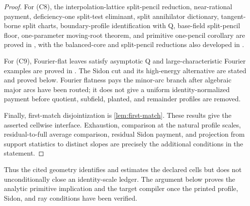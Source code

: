 \documentclass[11pt,a4paper]{amsart}
\numberwithin{equation}{section}
\theoremstyle{remark}
\begin{document}
\begin{proof}
For \textup{(C8)}, the interpolation-lattice split-pencil reduction, near-rational payment, deficiency-one split-test eliminant, split annihilator dictionary, tangent-borne split charts, boundary-profile identification with Q, base-field split-pencil floor, one-parameter moving-root theorem, and primitive one-pencil corollary are proved in \cite[split-pencil and BC sections]{Cho26Grande}, with the balanced-core and split-pencil reductions also developed in \cite[rank-one and split-pencil reductions]{Cho26CapV13}.

For \textup{(C9)}, Fourier-flat leaves satisfy asymptotic Q and
large-characteristic Fourier examples are proved in
\cite[Fourier-flat Q section]{Cho26Grande}.  The Sidon cut and its
high-energy alternative are stated and proved below.  Fourier flatness pays
the minor-arc branch after algebraic major arcs have been routed; it does
not give a uniform identity-normalized payment before quotient, subfield,
planted, and remainder profiles are removed.

Finally, first-match disjointization is \cref{lem:first-match}.  These
results give the asserted cellwise interface.  Exhaustion, comparison at
the natural profile scales, residual-to-full average comparison, residual
Sidon payment, and projection from support statistics to distinct slopes
are precisely the additional conditions in the statement.
\end{proof}

Thus the cited geometry identifies and estimates the declared cells but
does not unconditionally close an identity-scale ledger.  The argument
below proves the analytic primitive implication and the target compiler
once the printed profile, Sidon, and ray conditions have been verified.
\end{document}
